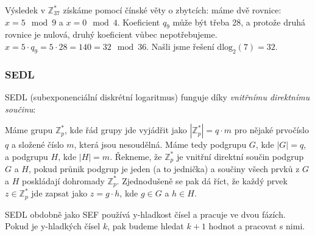 \documentclass[10pt,a4paper]{article}
\begin{document}
Výsledek v $\mathbb{Z}_{37}^*$ získáme pomocí čínské věty o zbytcích: máme dvě rovnice: $x = 5 \mod 9$ a $x = 0 \mod 4$. Koeficient $q_9$ může být třeba 28, a protože druhá rovnice je nulová, druhý koeficient vůbec nepotřebujeme. $x = 5\cdot q_9 = 5\cdot 28 = 140 = 32 \mod 36$. Našli jsme řešení $\text{dlog}_2(7) = 32$.

\subsubsection{SEDL}
SEDL (subexponenciální diskrétní logaritmus) funguje díky \textit{vnitřnímu direktnímu součinu}:

Máme grupu $\mathbb{Z}_p^*$, kde řád grupy jde vyjádřit jako $|\mathbb{Z}_p^*| = q\cdot m$ pro nějaké prvočíslo $q$ a složené číslo $m$, která jsou nesoudělná. Máme tedy podgrupu $G$, kde $|G| = q$, a podgrupu $H$, kde $|H| = m$. Řekneme, že $\mathbb{Z}_p^*$ je vnitřní direktní součin podgrup $G$ a $H$, pokud průnik podgrup je jeden (a to jednička) a součiny všech prvků z $G$ a $H$ poskládají dohromady $\mathbb{Z}_p^*$. Zjednodušeně se pak dá říct, že každý prvek $z \in \mathbb{Z}_p^*$ jde zapsat jako $z = g\cdot h$, kde $g \in G$ a $h \in H$.

SEDL obdobně jako SEF používá y-hladkost čísel a pracuje ve dvou fázích. Pokud je y-hladkých čísel $k$, pak budeme hledat $k+1$ hodnot a pracovat s nimi. 
\end{document}
